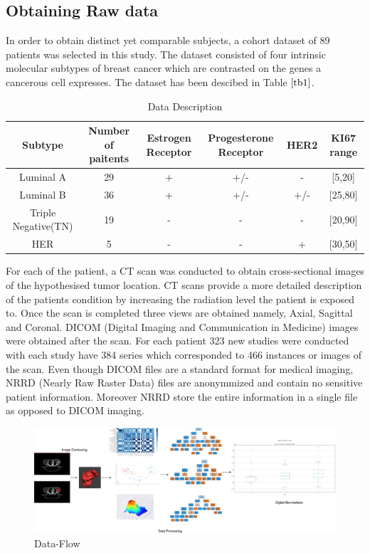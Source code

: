 \documentclass[final,1p,times,twocolumn]{elsarticle}
\begin{document}
\subsection{Obtaining Raw data}

In order to obtain distinct yet comparable subjects, a cohort dataset of 89 patients was selected in this study. The dataset consisted of four intrinsic molecular subtypes of breast cancer which are contrasted on the genes a cancerous cell expresses. The dataset has been descibed in Table $\ref{tb1}$.

\begin{table}[!b]
\scriptsize
\centering
\caption{Data Description}
\label{tb1}
\begin{tabular}{| c | c | c | c | c | c |}
\hline
\textbf{Subtype} & \textbf{Number of paitents} & \textbf{Estrogen Receptor} & \textbf{Progesterone Receptor} & \textbf{HER2} & \textbf{KI67 range}\\
\hline
Luminal A & 29 & + & +/- & - & [5,20] \\
Luminal B & 36 & + & +/- & +/- & [25,80] \\
Triple Negative(TN) & 19 & - & - & - & [20,90] \\
HER & 5 & - & - & + & [30,50]\\
\hline
\end{tabular}
\end{table}

For each of the patient, a CT scan was conducted to obtain cross-sectional images of the hypothesised tumor location. CT scans provide a more detailed description of the patients condition by increasing the radiation level the patient is exposed to. Once the scan is completed three views are obtained namely, Axial, Sagittal and Coronal. DICOM (Digital Imaging and Communication in Medicine) images were obtained after the scan. For each patient 323 new studies were conducted with each study have 384 series which corresponded to 466 instances or images of the scan. Even though DICOM files are a standard format for medical imaging, NRRD (Nearly Raw Raster Data) files are anonymmized and contain no sensitive patient information. Moreover NRRD store the entire information in a single file as opposed to DICOM imaging.



\begin{figure}[!b]
\centering
\includegraphics[width=6.5in]{im.png}
\caption{Data-Flow}
\label{img2}
\end{figure}
\end{document}
